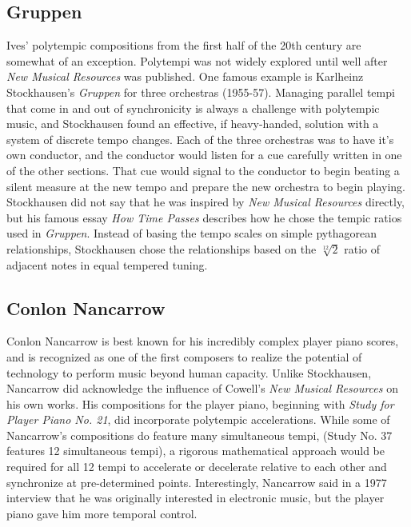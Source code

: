 \subsection{Gruppen}
\label{sec:gruppen}
Ives' polytempic compositions from the first half of the 20th century
are somewhat of an exception. Polytempi was not widely explored until
well after \textit{New Musical Resources} was published. One famous
example is Karlheinz Stockhausen's \textit{Gruppen} for three
orchestras (1955-57). Managing parallel tempi that come in and out of
synchronicity is always a challenge with polytempic music, and
Stockhausen found an effective, if heavy-handed, solution with a
system of discrete tempo changes. Each of the three orchestras was to
have it's own conductor, and the conductor would listen for a cue
carefully written in one of the other sections. That cue would signal
to the conductor to begin beating a silent measure at the new tempo
and prepare the new orchestra to begin playing.  Stockhausen did not
say that he was inspired by \textit{New Musical Resources} directly,
but his famous essay \textit{How Time Passes} describes how he chose
the tempic ratios used in \textit{Gruppen}. Instead of basing the
tempo scales on simple pythagorean relationships, Stockhausen chose
the relationships based on the $\sqrt[12]{2}$ ratio of adjacent notes
in equal tempered tuning.


\subsection{Conlon Nancarrow}
\label{sec:conlon-nancarrow}
Conlon Nancarrow is best known for his incredibly complex player piano
scores, and is recognized as one of the first composers to realize the
potential of technology to perform music beyond human capacity. Unlike
Stockhausen, Nancarrow did acknowledge the influence of Cowell's
\textit{New Musical Resources} on his own works. His compositions for
the player piano, beginning with \textit{Study for Player Piano
  No. 21}, did incorporate polytempic
accelerations\cite{Rao2005}. While some of Nancarrow's compositions do
feature many simultaneous tempi, (Study No. 37 features 12
simultaneous tempi)\cite{Greschak2003}, a rigorous mathematical
approach would be required for all 12 tempi to accelerate or
decelerate relative to each other and synchronize at pre-determined
points. Interestingly, Nancarrow said in a 1977 interview that he was
originally interested in electronic music, but the player piano gave
him more temporal control.\cite{Amirkhanian1977}

